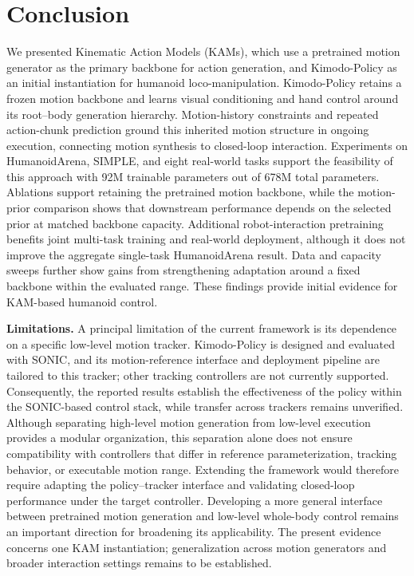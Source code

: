 \section{Conclusion}
\label{sec:conclusion}

We presented Kinematic Action Models (KAMs), which use a pretrained motion generator as the primary backbone for action generation, and Kimodo-Policy as an initial instantiation for humanoid loco-manipulation. Kimodo-Policy retains a frozen motion backbone and learns visual conditioning and hand control around its root--body generation hierarchy. Motion-history constraints and repeated action-chunk prediction ground this inherited motion structure in ongoing execution, connecting motion synthesis to closed-loop interaction. Experiments on HumanoidArena, SIMPLE, and eight real-world tasks support the feasibility of this approach with 92M trainable parameters out of 678M total parameters. Ablations support retaining the pretrained motion backbone, while the motion-prior comparison shows that downstream performance depends on the selected prior at matched backbone capacity. Additional robot-interaction pretraining benefits joint multi-task training and real-world deployment, although it does not improve the aggregate single-task HumanoidArena result. Data and capacity sweeps further show gains from strengthening adaptation around a fixed backbone within the evaluated range. These findings provide initial evidence for KAM-based humanoid control.

\textbf{Limitations.} A principal limitation of the current framework is its dependence on a specific low-level motion tracker. Kimodo-Policy is designed and evaluated with SONIC, and its motion-reference interface and deployment pipeline are tailored to this tracker; other tracking controllers are not currently supported. Consequently, the reported results establish the effectiveness of the policy within the SONIC-based control stack, while transfer across trackers remains unverified. Although separating high-level motion generation from low-level execution provides a modular organization, this separation alone does not ensure compatibility with controllers that differ in reference parameterization, tracking behavior, or executable motion range. Extending the framework would therefore require adapting the policy–tracker interface and validating closed-loop performance under the target controller. Developing a more general interface between pretrained motion generation and low-level whole-body control remains an important direction for broadening its applicability. The present evidence concerns one KAM instantiation; generalization across motion generators and broader interaction settings remains to be established.

